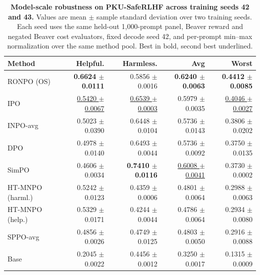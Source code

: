 \begin{table}[t]
\centering
\small
\setlength{\tabcolsep}{4.5pt}
\begin{tabular}{lrrrr}
\toprule
Method & Helpful. & Harmless. & Avg & Worst \\
\midrule
RONPO (OS) & \textbf{0.6624 $\pm$ 0.0111} & 0.5856 $\pm$ 0.0016 & \textbf{0.6240 $\pm$ 0.0063} & \textbf{0.4412 $\pm$ 0.0085} \\
IPO & \underline{0.5420 $\pm$ 0.0067} & \underline{0.6539 $\pm$ 0.0003} & 0.5979 $\pm$ 0.0035 & \underline{0.4046 $\pm$ 0.0027} \\
INPO-avg & 0.5023 $\pm$ 0.0390 & 0.6448 $\pm$ 0.0104 & 0.5736 $\pm$ 0.0143 & 0.3806 $\pm$ 0.0202 \\
DPO & 0.4978 $\pm$ 0.0140 & 0.6493 $\pm$ 0.0044 & 0.5736 $\pm$ 0.0092 & 0.3750 $\pm$ 0.0135 \\
SimPO & 0.4606 $\pm$ 0.0034 & \textbf{0.7410 $\pm$ 0.0116} & \underline{0.6008 $\pm$ 0.0041} & 0.3730 $\pm$ 0.0002 \\
HT-MNPO (harml.) & 0.5242 $\pm$ 0.0123 & 0.4359 $\pm$ 0.0006 & 0.4801 $\pm$ 0.0064 & 0.2988 $\pm$ 0.0063 \\
HT-MNPO (help.) & 0.5329 $\pm$ 0.0171 & 0.4244 $\pm$ 0.0044 & 0.4786 $\pm$ 0.0064 & 0.2934 $\pm$ 0.0080 \\
SPPO-avg & 0.4856 $\pm$ 0.0026 & 0.4749 $\pm$ 0.0125 & 0.4803 $\pm$ 0.0050 & 0.2916 $\pm$ 0.0088 \\
\midrule
Base & 0.2045 $\pm$ 0.0022 & 0.4456 $\pm$ 0.0012 & 0.3250 $\pm$ 0.0017 & 0.1315 $\pm$ 0.0009 \\
\bottomrule
\end{tabular}
\caption{\textbf{Model-scale robustness on PKU-SafeRLHF across training seeds 42 and 43.} Values are mean $\pm$ sample standard deviation over two training seeds. Each seed uses the same held-out 1{,}000-prompt panel, Beaver reward and negated Beaver cost evaluators, fixed decode seed 42, and per-prompt min--max normalization over the same method pool. Best in bold, second best underlined.}
\label{tab:saferlhf-robust-two-seed}
\end{table}
